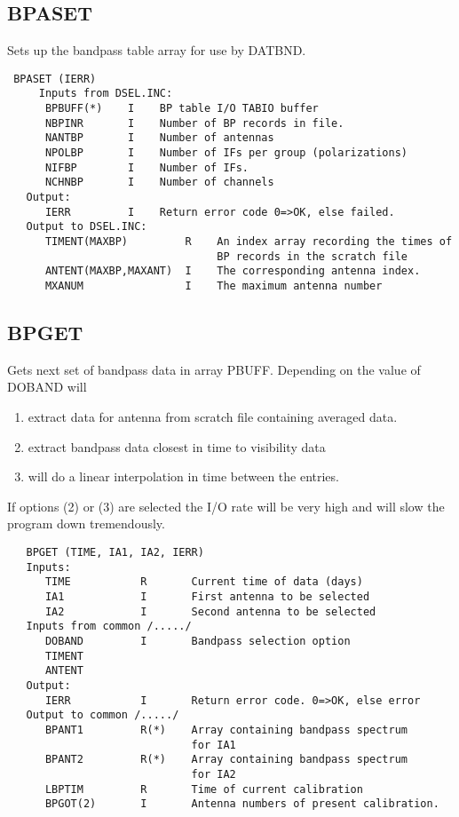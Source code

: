 \subsection{BPASET}
Sets up the bandpass table array for use by DATBND.
\begin{verbatim}
 BPASET (IERR)
     Inputs from DSEL.INC:
      BPBUFF(*)    I    BP table I/O TABIO buffer
      NBPINR       I    Number of BP records in file.
      NANTBP       I    Number of antennas
      NPOLBP       I    Number of IFs per group (polarizations)
      NIFBP        I    Number of IFs.
      NCHNBP       I    Number of channels
   Output:
      IERR         I    Return error code 0=>OK, else failed.
   Output to DSEL.INC:
      TIMENT(MAXBP)         R    An index array recording the times of
                                 BP records in the scratch file
      ANTENT(MAXBP,MAXANT)  I    The corresponding antenna index.
      MXANUM                I    The maximum antenna number
\end{verbatim}

\subsection{BPGET}
Gets next set of bandpass data in array PBUFF.
Depending on the value of DOBAND will
\begin{enumerate}
\item extract data for antenna from scratch file containing averaged
data.
\item extract bandpass data closest in time to visibility data
\item will do a linear interpolation in time between the entries.
\end{enumerate}
If options (2) or (3) are selected the I/O rate will be very high
and will slow the program down tremendously.
\begin{verbatim}
   BPGET (TIME, IA1, IA2, IERR)
   Inputs:
      TIME           R       Current time of data (days)
      IA1            I       First antenna to be selected
      IA2            I       Second antenna to be selected
   Inputs from common /...../
      DOBAND         I       Bandpass selection option
      TIMENT
      ANTENT
   Output:
      IERR           I       Return error code. 0=>OK, else error
   Output to common /...../
      BPANT1         R(*)    Array containing bandpass spectrum
                             for IA1
      BPANT2         R(*)    Array containing bandpass spectrum
                             for IA2
      LBPTIM         R       Time of current calibration
      BPGOT(2)       I       Antenna numbers of present calibration.
\end{verbatim}

